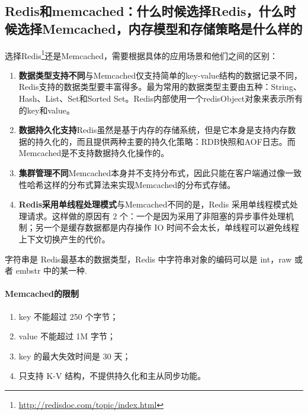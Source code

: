 \documentclass[../../../interview-questions.tex]{subfiles}
\begin{document}
\subsection{Redis和memcached：什么时候选择Redis，什么时候选择Memcached，内存模型和存储策略是什么样的}

选择Redis\footnote{\url{http://redisdoc.com/topic/index.html}}还是Memcached，需要根据具体的应用场景和他们之间的区别：

\begin{enumerate}
\item {\textbf{数据类型支持不同}}与Memcached仅支持简单的key-value结构的数据记录不同，Redis支持的数据类型要丰富得多。最为常用的数据类型主要由五种：String、Hash、List、Set和Sorted Set。Redis内部使用一个redisObject对象来表示所有的key和value。
\item {\textbf{数据持久化支持}}Redis虽然是基于内存的存储系统，但是它本身是支持内存数据的持久化的，而且提供两种主要的持久化策略：RDB快照和AOF日志。而Memcached是不支持数据持久化操作的。
\item {\textbf{集群管理不同}}Memcached本身并不支持分布式，因此只能在客户端通过像一致性哈希这样的分布式算法来实现Memcached的分布式存储。
\item {\textbf{Redis采用单线程处理模式}}与Memcached不同的是，Redis 采用单线程模式处理请求。这样做的原因有 2 个：一个是因为采用了非阻塞的异步事件处理机制；另一个是缓存数据都是内存操作 IO 时间不会太长，单线程可以避免线程上下文切换产生的代价。
\end{enumerate}                                  

字符串是 Redis最基本的数据类型，Redis 中字符串对象的编码可以是 int，raw 或者 embstr 中的某一种.

\paragraph{Memcached的限制}

\begin{enumerate}
    \item {key 不能超过 250 个字节；}
    \item {value 不能超过 1M 字节；}
    \item {key 的最大失效时间是 30 天；}
    \item {只支持 K-V 结构，不提供持久化和主从同步功能。}
\end{enumerate}
\end{document}
